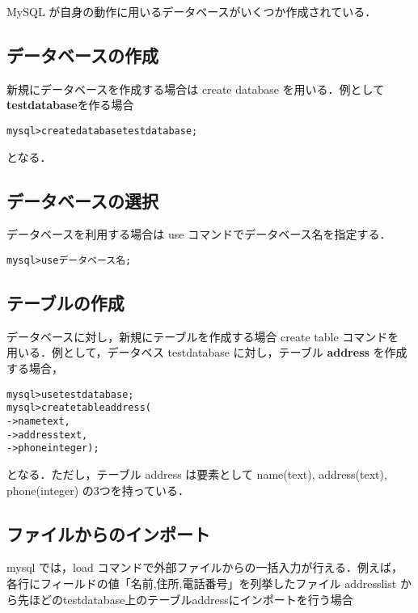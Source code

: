 MySQL が自身の動作に用いるデータベースがいくつか作成されている．
	
\subsection*{データベースの作成}
新規にデータベースを作成する場合は create database を用いる．例として\textbf{testdatabase}を作る場合
	\begin{center}
	\begin{breakbox}
	\begin{alltt}
		mysql> create database testdatabase;
	\end{alltt}
	\end{breakbox}
	\end{center}
となる．

\subsection*{データベースの選択}
データベースを利用する場合は use コマンドでデータベース名を指定する．
	\begin{center}
	\begin{breakbox}
	\begin{alltt}
		mysql> use データベース名;
	\end{alltt}
	\end{breakbox}
	\end{center}

\subsection*{テーブルの作成}
データベースに対し，新規にテーブルを作成する場合 create table コマンドを
用いる．例として，データベス testdatabase に対し，テーブル 
\textbf{address} を作成する場合，

	\begin{center}
	\begin{breakbox}
	\begin{alltt}
		mysql> use testdatabase;
		mysql> create table address (
		    -> name text,
		    -> address text,
		    -> phone integer );
	\end{alltt}
	\end{breakbox}
	\end{center}
となる．ただし，テーブル address は要素として name(text), address(text), phone(integer) の3つを持っている．
	
\subsection*{ファイルからのインポート}
mysql では，load コマンドで外部ファイルからの一括入力が行える．例えば，
各行にフィールドの値「名前,住所,電話番号」を列挙したファイル addresslist 
から先ほどのtestdatabase上のテーブルaddressにインポートを行う場合

